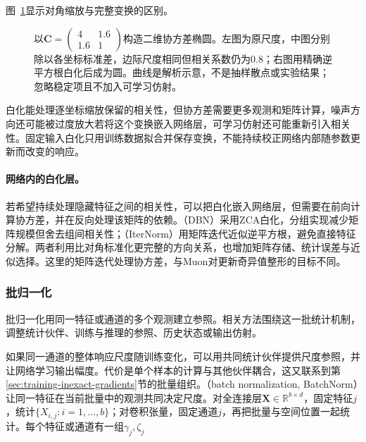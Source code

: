 图~\ref{fig:training-whitening}显示对角缩放与完整变换的区别。
\begin{figure}[htbp]
  \centering
  
  \caption{以$\bm C=\left(\begin{smallmatrix}4&1.6\\1.6&1\end{smallmatrix}\right)$构造二维协方差椭圆。左图为原尺度，中图分别除以各坐标标准差，边际尺度相同但相关系数仍为0.8；右图用精确逆平方根白化后成为圆。曲线是解析示意，不是抽样散点或实验结果；忽略稳定项且不加入可学习仿射。}
  \label{fig:training-whitening}
\end{figure}
\FloatBarrier

白化能处理逐坐标缩放保留的相关性，但协方差需要更多观测和矩阵计算，噪声方向还可能被过度放大若将这个变换嵌入网络层，可学习仿射还可能重新引入相关性。固定输入白化只用训练数据拟合并保存变换，不能持续校正网络内部随参数更新而改变的响应。

\paragraph{网络内的白化层。}

若希望持续处理隐藏特征之间的相关性，可以把白化嵌入网络层，但需要在前向计算协方差，并在反向处理该矩阵的依赖。（DBN）采用ZCA白化，分组实现减少矩阵规模但舍去组间相关性；（IterNorm）用矩阵迭代近似逆平方根，避免直接特征分解。两者利用比对角标准化更完整的方向关系，也增加矩阵存储、统计误差与近似选择。这里的矩阵迭代处理协方差，与Muon对更新奇异值整形的目标不同。

\subsubsection{批归一化}
\label{sec:training-batchnorm-family}
\label{sec:training-batchnorm}
\label{sec:training-batchnorm-variants}
\label{sec:training-other-batchnorm}
\label{sec:training-batch-renorm}
\label{sec:training-online-powernorm}
\label{sec:training-conditional-norm}
\label{sec:training-temporal-batchnorm}
\label{sec:training-batch-channel-normalization}
批归一化用同一特征或通道的多个观测建立参照。相关方法围绕这一批统计机制，调整统计伙伴、训练与推理的参照、历史状态或输出仿射。

如果同一通道的整体响应尺度随训练变化，可以用共同统计伙伴提供尺度参照，并让网络学习输出幅度。代价是单个样本的计算与其他伙伴耦合，这又联系到第\ref{sec:training-inexact-gradients}节的批量组织。（batch normalization, BatchNorm）让同一特征在当前批量中的观测共同决定尺度。对全连接层$\bm X\in\mathbb R^{b\times d}$，固定特征$j$，统计$\{X_{i,j}:i=1,\ldots,b\}$；对卷积张量，固定通道$j$，再把批量与空间位置一起统计。每个特征或通道有一组$\gamma_j,\zeta_j$


